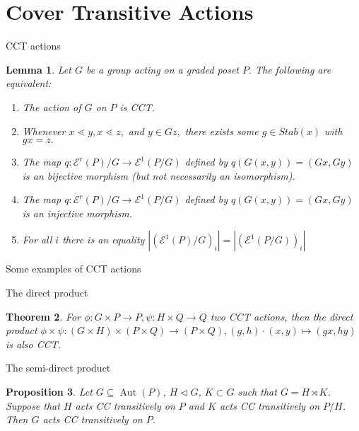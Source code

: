 \documentclass{beamer}
\newtheorem{thm}{Theorem}
\newtheorem{lem}[thm]{Lemma}
\newtheorem{prop}[thm]{Proposition}
\theoremstyle{remark}
\begin{document}
\section{Cover Transitive Actions}

\begin{frame}{CCT actions}
\begin{lem}
\label{lem:cover_transitive_equivalence}
Let $G$ be a group acting on a graded poset $P.$ The following are equivalent:
\begin{enumerate}
	\item The action of $G$ on $P$ is CCT.
	\item Whenever $x \lessdot y,x \lessdot z,$ and $y \in Gz,$ there exists some $g \in Stab(x)$ with $gx = z.$
	\item The map $q\colon \mathcal E^r(P)/G\rightarrow \mathcal E^1(P/G)$ defined by $q(G(x, y)) = (Gx,Gy)$ is an bijective morphism (but not necessarily an isomorphism).
	\item The map $q\colon \mathcal E^r(P)/G\rightarrow \mathcal E^1(P/G)$ defined by $q(G(x, y)) = (Gx,Gy)$ is an injective morphism.
	\item For all $i$ there is an equality $|(\mathcal E^1(P)/G)_i|=| (\mathcal E^1(P/G))_i|$
\end{enumerate}
\end{lem}

\end{frame}





\begin{frame}{Some examples of CCT actions}

\end{frame}




\begin{frame}{The direct product}
\begin{thm}
\label{thm:direct_product_preservation}
For $\phi:G\times P\rightarrow P,\psi:H \times Q \rightarrow Q$ two CCT actions, then the direct product $\phi \times \psi:(G\times H)\times (P\times Q) \rightarrow (P\times Q),(g,h)\cdot (x,y) \mapsto (gx,hy)$ is also CCT.
\end{thm}
\end{frame}





\begin{frame}{The semi-direct product}
\begin{prop}\label{prop:semidirect_product_cover_transitive_actions}
Let $G\subseteq \operatorname{Aut}(P)$, $H\triangleleft G$, $K\subset G$ such that $G = H\rtimes K$.  Suppose that $H$ acts CC transitively on $P$ and $K$ acts CC transitively on $P/H$.  Then $G$ acts CC transitively on $P$.
\end{prop}
\end{frame}
\end{document}
